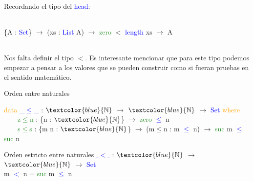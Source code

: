 \documentclass[xcolor=dvipsnames]{beamer} %
\newcommand{\cf}[1]{\textcolor{blue}{#1}}
\newcommand{\ct}[1]{\textcolor{blue}{#1}}
\newcommand{\cc}[1]{\textcolor{ForestGreen}{#1}}
\newcommand{\ck}[1]{\textcolor{orange}{#1}}
\newcommand{\N}{\ct{\mathbb{N}}}
\newcommand{\ra}{\rightarrow}
\begin{document}
\begin{frame}
\begin{block}{}
Recordando el tipo del \cf{head}:\\

\

\{A : \ct{Set}\} $\ra$ 
(xs : \ct{List} A) $\ra$ \cc{zero} $<$ \cf{length} xs $\ra$ A\\

\

Nos falta definir el tipo $<$. Es interesante mencionar que para
este tipo podemos empezar a pensar a los valores que se pueden construir
como si fueran pruebas en el sentido matemático.
\end{block}

\pause

\begin{block}{Orden entre naturales}

\ck{data} \ct{\_$\leq$\_} : $\N$ $\ra$ $\N$ $\ra$ \ct{Set} \ck{where}\\
\ \ \ \ \cc{z$\leq$n} : \{n : $\N$\}                 $\ra$ \cc{zero}  \ct{$\leq$} n\\
\ \ \ \ \cc{s$\leq$s} : \{m n : $\N$\} $\ra$ (m$\leq$n : m \ct{$\leq$} n) $\ra$ \cc{suc} m \ct{$\leq$} \cc{suc} n

\end{block}

\pause

\begin{block}{Orden estricto entre naturales}
\cf{$\_<\_$} : $\N$ $\ra$ $\N$ $\ra$ \ct{Set}\\
m \cf{$<$} n = \cc{suc} m \cf{$\leq$} n
\end{block}

\end{frame}
\end{document}
